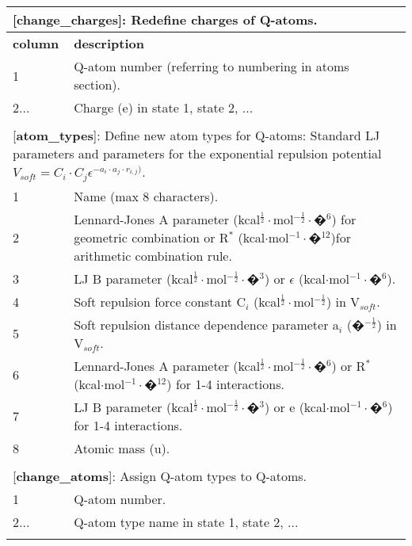 \documentclass[a4paper,10pt]{article}
\begin{document}
\begin{longtable}{|p{53pt}|p{181pt}|p{160pt}|}
\multicolumn{3}{p{394pt}}{[\textbf{change\_charges}]: Redefine charges of Q-atoms.}\\
\hline \textbf{column} & \multicolumn{2}{p{341pt}|}{\textbf{description}}\\
\hline 1 & \multicolumn{2}{p{341pt}|}{Q-atom number (referring to numbering in atoms section).}\\
\hline 2... & \multicolumn{2}{p{341pt}|}{Charge (e) in state 1, state 2, ...}\\
\hline
\multicolumn{3}{p{394pt}}{}\\

\multicolumn{3}{p{394pt}}{[\textbf{atom\_types}]: Define new atom types for Q-atoms: Standard LJ parameters and parameters for the exponential repulsion potential $V_{soft} = C_i\cdot C_j\epsilon^{-a_i\cdot a_j\cdot r_{i,j})}$.}\\
\hline 1 & \multicolumn{2}{p{341pt}|}{Name (max 8 characters).}\\
\hline 2 & \multicolumn{2}{p{341pt}|}{Lennard-Jones A parameter (kcal$^{\frac{1}{2}}\cdot$mol$^{-\frac{1}{2}}\cdot$�$^{6}$) for geometric combination or R$^*$ (kcal$\cdot$mol$^{-1}\cdot$�$^{12}$)for arithmetic combination rule.}\\
\hline 3 & \multicolumn{2}{p{341pt}|}{LJ B parameter (kcal$^{\frac{1}{2}}\cdot$mol$^{-\frac{1}{2}}\cdot$�$^{3}$) or $\epsilon$ (kcal$\cdot$mol$^{-1}\cdot$�$^{6}$).}\\
\hline 4 & \multicolumn{2}{p{341pt}|}{Soft repulsion force constant C$_i$ (kcal$^{\frac{1}{2}}\cdot$mol$^{-\frac{1}{2}}$) in V$_{soft}$.}\\
\hline 5 & \multicolumn{2}{p{341pt}|}{Soft repulsion distance dependence parameter a$_i$ (�$^{-\frac{1}{2}}$) in V$_{soft}$.}\\
\hline 6 & \multicolumn{2}{p{341pt}|}{Lennard-Jones A parameter (kcal$^{\frac{1}{2}}\cdot$mol$^{-\frac{1}{2}}\cdot$�$^{6}$) or R$^*$ (kcal$\cdot$mol$^{-1}\cdot$�$^{12}$) for 1-4 interactions.}\\
\hline 7 & \multicolumn{2}{p{341pt}|}{LJ B parameter (kcal$^{\frac{1}{2}}\cdot$mol$^{-\frac{1}{2}}\cdot$�$^{3}$) or e (kcal$\cdot$mol$^{-1}\cdot$�$^{6}$) for 1-4 interactions.}\\
\hline 8 & \multicolumn{2}{p{341pt}|}{Atomic mass (u).}\\
\hline
\multicolumn{3}{p{394pt}}{}\\

\multicolumn{3}{p{394pt}}{[\textbf{change\_atoms}]: Assign Q-atom types to Q-atoms.}\\
\hline 1 & \multicolumn{2}{p{341pt}|}{Q-atom number.}\\
\hline 2... & \multicolumn{2}{p{341pt}|}{Q-atom type name in state 1, state 2, ...}\\
\hline
\multicolumn{3}{p{394pt}}{}\\


\end{longtable}
\end{document}
